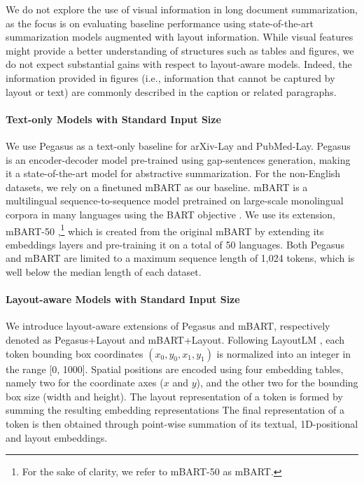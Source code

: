 We do not explore the use of visual information in long document summarization, as the focus is on evaluating baseline performance using state-of-the-art summarization models augmented with layout information. While visual features might provide a better understanding of structures such as tables and figures, we do not expect substantial gains with respect to layout-aware models. Indeed, the information provided in figures (i.e., information that cannot be captured by layout or text) are commonly described in the caption or related paragraphs. 

\paragraph{Text-only Models with Standard Input Size}

We use Pegasus \citep{zhang2020pegasus} as a text-only baseline for arXiv-Lay and PubMed-Lay. Pegasus is an encoder-decoder model pre-trained using gap-sentences generation, making it a state-of-the-art model for abstractive summarization.
For the non-English datasets, we rely on a finetuned mBART as our baseline. mBART \citep{liu2020multilingual} is a multilingual sequence-to-sequence model pretrained on large-scale monolingual corpora in many languages using the BART objective \citep{lewis2019bart}. We use its extension, mBART-50 \citep{tang2020multilingual},\footnote{For the sake of clarity, we refer to mBART-50 as mBART.} which is created from the original mBART by extending its embeddings layers and pre-training it on a total of 50 languages. 
Both Pegasus and mBART are limited to a maximum sequence length of 1,024 tokens, which is well below the median length of each dataset.

\paragraph{Layout-aware Models with Standard Input Size}

We introduce layout-aware extensions of Pegasus and mBART, respectively denoted as Pegasus+Layout and mBART+Layout. Following LayoutLM \citep{xu2020layoutlm}, each token bounding box coordinates $(x_0, y_0, x_1, y_1)$ is normalized into an integer in the range [0, 1000]. Spatial positions are encoded using four embedding tables, namely two for the coordinate axes ($x$ and $y$), and the other two for the bounding box size (width and height). The layout representation of a token is formed by summing the resulting embedding representations
The final representation of a token is then obtained through point-wise summation of its textual, 1D-positional and layout embeddings.

